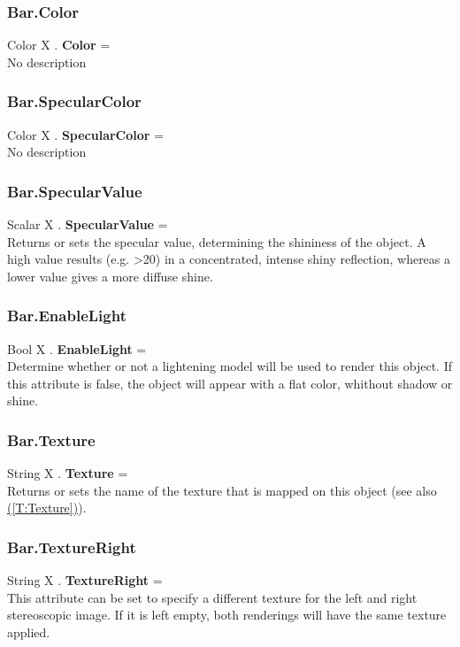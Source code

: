 \documentclass[10pt]{book}
\newcommand{\linkitem}[1]{\hyperref[#1]{\nameref{#1} (\ref{#1})}}
\begin{document}
\subsubsection{Bar.Color \label{F:Bar:Color}}
Color X . \textbf{Color} = \\
No description

\subsubsection{Bar.SpecularColor \label{F:Bar:SpecularColor}}
Color X . \textbf{SpecularColor} = \\
No description

\subsubsection{Bar.SpecularValue \label{F:Bar:SpecularValue}}
Scalar X . \textbf{SpecularValue} = \\
Returns or sets the specular value, determining the shininess of the object. A high value results (e.g. >20) in a concentrated, intense shiny reflection, whereas a lower value gives a more diffuse shine.

\subsubsection{Bar.EnableLight \label{F:Bar:EnableLight}}
Bool X . \textbf{EnableLight} = \\
Determine whether or not a lightening model will be used to render this object. If this attribute is false, the object will appear with a flat color, whithout shadow or shine.

\subsubsection{Bar.Texture \label{F:Bar:Texture}}
String X . \textbf{Texture} = \\
Returns or sets the name of the texture that is mapped on this object (see also \linkitem{T:Texture}).

\subsubsection{Bar.TextureRight \label{F:Bar:TextureRight}}
String X . \textbf{TextureRight} = \\
This attribute can be set to specify a different texture for the left and right stereoscopic image. If it is left empty, both renderings will have the same texture applied.
\end{document}
